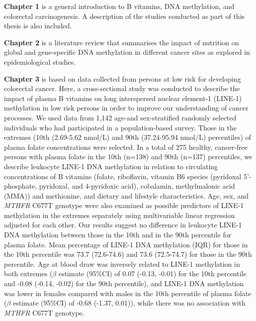 \noindent \textbf{Chapter 1} is a general introduction to B vitamins, DNA methylation, and colorectal carcinogenesis. A description of the studies conducted as part of this thesis is also included.

\noindent \textbf{Chapter 2} is a literature review that summarises the impact of nutrition on global and gene-specific DNA methylation in different cancer sites as explored in epidemiological studies.

\noindent \textbf{Chapter 3} is based on data  collected from persons at low risk for developing colorectal cancer. Here, a cross-sectional study was conducted to describe the impact of plasma B vitamins on long interspersed nuclear element-1 (LINE-1) methylation in low risk persons in order to improve our understanding of cancer processes. We used data from 1,142 age-and sex-stratified randomly selected individuals who had participated in a population-based survey. Those in the extremes (10th (2.69-5.62 nmol/L) and 90th (37.24-95.94 nmol/L) percentiles) of plasma folate concentrations were selected. In a total of 275 healthy, cancer-free persons with plasma folate in the 10th (n=138) and 90th (n=137) percentiles, we describe leukocyte LINE-1 DNA methylation in relation to circulating concentrations of B vitamins (folate, riboflavin, vitamin B6 species (pyridoxal 5'-phosphate, pyridoxal, and 4-pyridoxic acid), cobalamin, methylmalonic acid (MMA)) and methionine, and dietary and lifestyle characteristics. Age, sex, and \emph{MTHFR} C677T genotype were also examined as possible predictors of LINE-1 methylation in the extremes separately using multivariable linear regression adjusted for each other. Our results suggest no difference in leukocyte LINE-1 DNA methylation between those in the 10th and in the 90th percentile for plasma folate. Mean percentage of LINE-1 DNA methylation (IQR) for those in the 10th percentile was 73.7 (72.6-74.6) and 73.6 (72.5-74.7) for those in the 90th percentile. Age at blood draw was inversely related to LINE-1 methylation in both extremes ($\beta$ estimate (95\%CI) of 0.07 (-0.13, -0.01) for the 10th percentile and -0.08 (-0.14, -0.02) for the 90th percentile), and LINE-1 DNA methylation was lower in females compared with males in the 10th percentile of plasma folate ($\beta$ estimate (95\%CI) of -0.68 (-1.37, 0.01)), while there was no association with \emph{MTHFR} C677T genotype.

